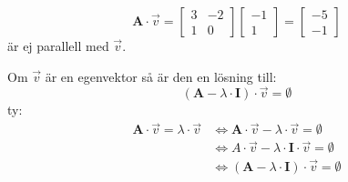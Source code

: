 \begin{Ex}
	\[
	\mathbf{A} \cdot \vec{v} = \begin{bmatrix} 3&-2\\1&0 \end{bmatrix}\begin{bmatrix} -1\\1 \end{bmatrix} = \begin{bmatrix} -5\\-1 \end{bmatrix}
	\]
	är ej parallell med $\vec{v}$.\\
\end{Ex}
Om $\vec{v}$ är en egenvektor så är den en lösning till:
\[
(\mathbf{A} - \lambda \cdot \mathbf{I}) \cdot \vec{v} = \emptyset
\]
ty:
\begin{align*}
\mathbf{A} \cdot \vec{v} = \lambda \cdot \vec{v} &\Leftrightarrow \mathbf{A} \cdot \vec{v} - \lambda \cdot \vec{v} = \emptyset\\
&\Leftrightarrow A \cdot \vec{v} - \lambda \cdot \mathbf{I} \cdot \vec{v} = \emptyset\\
&\Leftrightarrow(\mathbf{A} - \lambda \cdot \mathbf{I}) \cdot \vec{v} = \emptyset
\end{align*}

